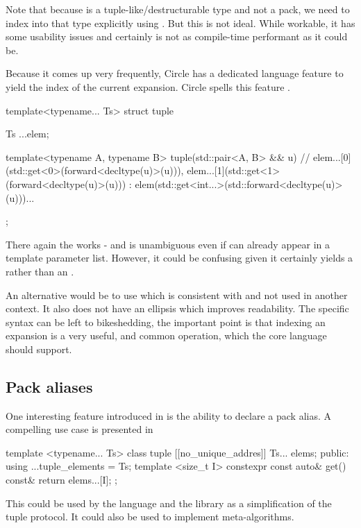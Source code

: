 \documentclass{wg21}
\begin{document}
Note that because  is a tuple-like/destructurable type and not a pack, we need to index into that type explicitly using .
But this is not ideal. While workable, it has some usability issues and certainly is not as compile-time performant as it could be.

Because it comes up very frequently, Circle has a dedicated language feature to yield the index of the current expansion.
Circle spells this feature .

\begin{colorblock}
template<typename... Ts>
struct tuple {
Ts ...elem;

template<typename A, typename B>
tuple(std::pair<A, B> && u)
 // elem...[0](std::get<0>(forward<decltype(u)>(u))), elem...[1](std::get<1>(forward<decltype(u)>(u)))
: elem(std::get<int...>(std::forward<decltype(u)>(u)))...
{ }
};
\end{colorblock}

There again the  works - and is unambiguous even if  can already appear in a template parameter list.
However, it could be confusing given it certainly yields a  rather than an .

An alternative would be to use \tcode{[:]} which is consistent with  and not used in another context.
It also does not have an ellipsis which improves readability.
The specific syntax can be left to bikeshedding, the important point is that indexing an expansion is a very useful, and common operation,
which the core language should support.


\subsection{Pack aliases}
\label{sec:packaliases}

One interesting feature introduced in  is the ability to declare a pack alias.
A compelling use case is presented in 

\begin{colorblock}
    template <typename... Ts>
    class tuple {
        [[no_unique_addres]] Ts... elems;
    public:
        using ...tuple_elements = Ts;
        template <size_t I>
        constexpr const auto& get() const& {
            return elems...[I];
        }
    };
\end{colorblock}

This could be used by the language and the library as a simplification of the tuple protocol.
It could also be used to implement meta-algorithms.
\end{document}

